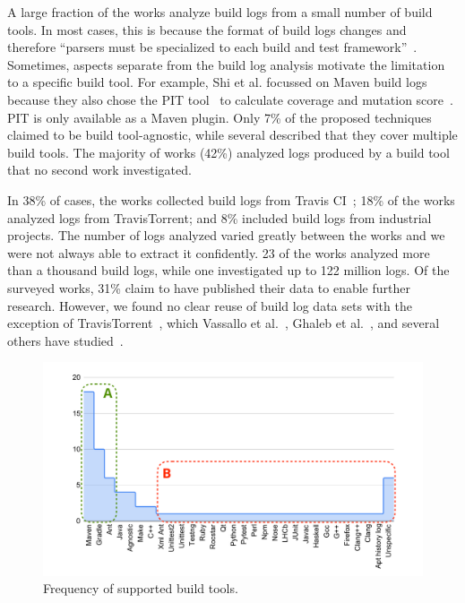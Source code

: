 A large fraction of the works analyze build logs
from a small number of build tools.
In most cases, this is because the format of build logs
changes and
therefore ``parsers must be specialized to each build and test
framework''~\cite{tomassi2019bugswarm}.
Sometimes, aspects separate from the build log analysis motivate
the limitation to a specific build tool.
For example, Shi et al.
focussed on Maven
build logs because they also chose the PIT tool~\cite{coles2016pit}
to calculate coverage
and mutation score~\cite{shi2018evaluating}.
PIT is only available as a Maven plugin.
Only 7\% of the proposed techniques claimed to be
build tool-agnostic, while
several described that they cover multiple build tools.
The majority of works (42\%) analyzed logs produced by a build tool
that no second work investigated.

In 38\% of cases, the works collected build logs from Travis
CI~\cite{travisci2019webpage};
18\% of the works analyzed logs from TravisTorrent; and 8\% included
build logs from industrial projects.
The number of logs analyzed varied greatly between the works
and we were not always able to
extract it confidently.
23 of the works analyzed more than a thousand build logs, while one
investigated up to 122 million logs.
Of the surveyed works, 31\% claim to have published their data to
enable further research.
However, we found no clear reuse of build log data sets with the
exception of TravisTorrent~\cite{beller2017travistorrent}, which
Vassallo et al.~\cite{vassallo2017a-tale},
Ghaleb et al.~\cite{ghaleb2019studying},
and several others have studied~\cite{hassan2017change,
hassan2019tackling,hassan2017automatic,orellana2017differences,
haghighatkhah2018test,madeyski2017continuous,ghaleb2019empirical,
santolucito2018statically,gallaba2018noise,shi2018evaluating}.

\begin{figure}[tbp]
		\centering
		\includegraphics[width=\columnwidth, trim={1.5cm 0.4cm
		1.5cm 0.5cm},
		clip]{img/lit-sur/log_producer_annotated.pdf}
		\caption{Frequency of supported build tools.}
		\label{fig:litsur:log_producer}
\end{figure}


